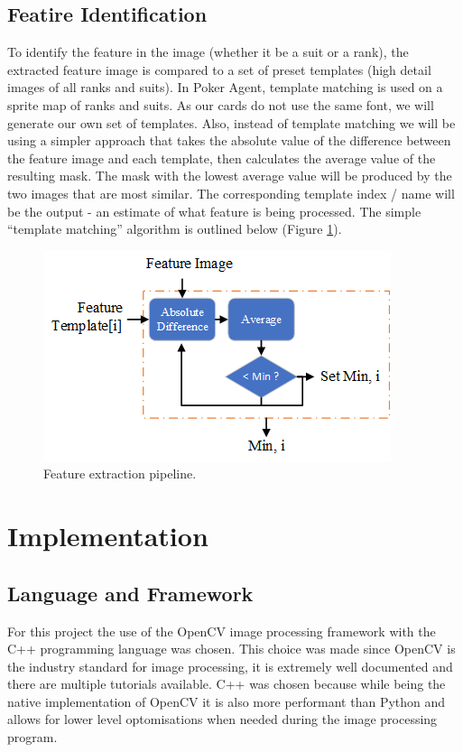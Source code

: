 \documentclass[conference]{IEEEtran}
\begin{document}
\subsection{Featire Identification}
To identify the feature in the image (whether it be a suit or a rank), the extracted feature image
is compared to a set of preset templates (high detail images of all ranks and suits). In Poker
Agent, template matching is used on a sprite map of ranks and suits. As our cards do not use the
same font, we will generate our own set of templates. Also, instead of template matching we will be
using a simpler approach that takes the absolute value of the difference between the feature image
and each template, then calculates the average value of the resulting mask. The mask with the lowest
average value will be produced by the two images that are most similar. The corresponding template
index / name will be the output - an estimate of what feature is being processed. The simple
“template matching” algorithm is outlined below (Figure \ref{fig:pipeline-feature-identification}).

\begin{figure}[htbp]
\centerline{\includegraphics[width=\columnwidth]{FeatureIdentification.png}}
\caption{Feature extraction pipeline.}
\label{fig:pipeline-feature-identification}
\end{figure}

\section{Implementation}

\subsection{Language and Framework}
For this project the use of the OpenCV image processing framework with the C++ programming language
was chosen. This choice was made since OpenCV is the industry standard for image processing, it is
extremely well documented and there are multiple tutorials available. C++ was chosen because while
being the native implementation of OpenCV it is also more performant than Python and allows for
lower level optomisations when needed during the image processing program.
\end{document}
